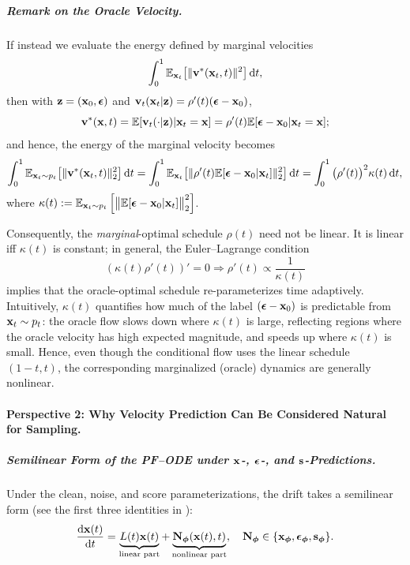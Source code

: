 \subparagraph{Remark on the Oracle Velocity.}
If instead we evaluate the energy defined by marginal velocities
\[
\int_0^1 \mathbb{E}_{{\mathbf{x}}_t} \big[\|{\mathbf{v}}^*({\mathbf{x}}_t, t)\|^2\big]\mathop{}\!\mathrm{d} t,
\]
then with ${\mathbf{z}}=({\mathbf{x}}_0,{\bm{\epsilon}})$ and ${\mathbf{v}}_t({\mathbf{x}}_t |{\mathbf{z}})=\rho'(t)({\bm{\epsilon}}-{\mathbf{x}}_0)$,
\[
{\mathbf{v}}^*({\mathbf{x}}, t)
=\mathbb{E}[{\mathbf{v}}_t(\cdot|{\mathbf{z}})|{\mathbf{x}}_t={\mathbf{x}}]
=\rho'(t) \mathbb{E}[{\bm{\epsilon}}-{\mathbf{x}}_0|{\mathbf{x}}_t={\mathbf{x}}];
\]
and hence, the energy of the marginal velocity becomes
\begin{align*}
  \int_0^1 \mathbb{E}_{{\mathbf{x}}_t\sim p_t} \big[\|{\mathbf{v}}^*({\mathbf{x}}_t, t)\|^2_2\big]\mathop{}\!\mathrm{d} t
   = \int_0^1 \mathbb{E}_{{\mathbf{x}}_t} \big[\| \rho'(t) \mathbb{E}[{\bm{\epsilon}}-{\mathbf{x}}_0|{\mathbf{x}}_t] \|^2_2\big]\mathop{}\!\mathrm{d} t  = \int_0^1 \big(\rho'(t)\big)^2 \kappa(t) \mathop{}\!\mathrm{d} t,
\end{align*}
where $\kappa(t):=\mathbb{E}_{{\mathbf{x}}_t\sim p_t} \left[\big\|\mathbb{E}[{\bm{\epsilon}}-{\mathbf{x}}_0|{\mathbf{x}}_t]\big\|^2_2\right]
$.

Consequently, the \emph{marginal}-optimal schedule $\rho(t)$ need not be linear.  
It is linear iff $\kappa(t)$ is constant; in general, the Euler–Lagrange condition
\[
(\kappa(t)\rho'(t))' = 0  \Rightarrow  \rho'(t)\propto \frac{1}{\kappa(t)}
\]
implies that the oracle-optimal schedule re-parameterizes time adaptively.
Intuitively, $\kappa(t)$ quantifies how much of the label $({\bm{\epsilon}}-{\mathbf{x}}_0)$ is predictable from ${\mathbf{x}}_t\sim p_t$:
the oracle flow slows down where $\kappa(t)$ is large, reflecting regions where the oracle velocity has high expected magnitude, and speeds up where $\kappa(t)$ is small. Hence, even though the conditional flow uses the linear schedule $(1-t,t)$,
the corresponding marginalized (oracle) dynamics are generally nonlinear.



\paragraph{Perspective 2: Why Velocity Prediction Can Be Considered Natural for Sampling.}

\subparagraph{Semilinear Form of the PF--ODE under ${\mathbf{x}}$-, ${\bm{\epsilon}}$-, and ${\mathbf{s}}$-Predictions.}
Under the clean, noise, and score parameterizations, the drift takes a semilinear form (see the first three identities in ):
\[
\frac{\mathop{}\!\mathrm{d} {\mathbf{x}}(t)}{\mathop{}\!\mathrm{d} t}= \underbrace{L(t) {\mathbf{x}}(t)}_{\text{linear part}} + \underbrace{{\mathbf{N}}_{\bm{\phi}}({\mathbf{x}}(t),t)}_{\text{nonlinear part}},
\quad
{\mathbf{N}}_{\bm{\phi}}\in\{{\mathbf{x}}_{{\bm{\phi}}}, {\bm{\epsilon}}_{{\bm{\phi}}}, {\mathbf{s}}_{{\bm{\phi}}}\}.
\]



